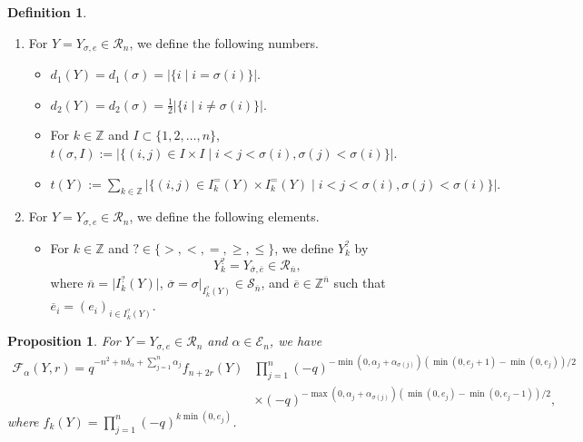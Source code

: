 \documentclass[11pt,oneside]{amsart}
\theoremstyle{plain}
\newtheorem{proposition}[theorem]{Proposition}
\theoremstyle{definition}
\newtheorem{definition}[theorem]{Definition}
\theoremstyle{remark}
\newcommand{\BZ}{{\mathbb Z}}
\newcommand{\CE}{{\mathcal E}}
\newcommand{\CF}{{\mathcal F}}
\newcommand{\CR}{{\mathcal R}}
\newcommand{\CS}{{\mathcal S}}
\numberwithin{equation}{section}
\begin{document}
\begin{definition}
\begin{enumerate}
			\item For $Y=Y_{\sigma,e} \in \CR_n$, we define the following numbers.
			\begin{itemize}
				\item $d_1(Y)=d_1(\sigma)=\vert \lbrace i \mid i=\sigma(i) \rbrace \vert $.
				\item $d_2(Y)=d_2(\sigma)=\frac{1}{2}\vert \lbrace i \mid i \neq \sigma(i) \rbrace \vert $.
				\item For $k \in \BZ$ and $I \subset \lbrace 1,2,\dots,n \rbrace$, $t(\sigma,I):=\vert \lbrace (i,j) \in I\times I \mid i < j <\sigma(i), \sigma(j) < \sigma(i) \rbrace\vert.$
				\item $t(Y):=\sum_{k \in \BZ}\vert \lbrace (i,j) \in I_k^{=}(Y)\times I_k^{=}(Y) \mid i < j <\sigma(i), \sigma(j) < \sigma(i) \rbrace\vert.$
			\end{itemize}
			
			\item For $Y=Y_{\sigma,e} \in \CR_n$, we define the following elements.
			\begin{itemize}
				\item For $k \in \BZ$ and $? \in \lbrace >,<,=,\geq, \leq \rbrace$, we define $Y^?_k$ by
				\begin{equation*}
					Y^{?}_k=Y_{\overline{\sigma},\overline{e}} \in \CR_{\overline{n}},
				\end{equation*}
				where $\overline{n}=\vert I^?_{k}(Y)\vert $, $\overline{\sigma}=\sigma\vert_{I^?_{k}(Y)} \in \CS_{\overline{n}}$, and $\overline{e} \in \BZ^{\overline{n}}$ such that $\overline{e}_i=(e_i)_{i \in I^?_{k}(Y)}$.
			\end{itemize}
			
		\end{enumerate}
	\end{definition}
	
	\begin{proposition}\label{proposition2.6}
		For $Y=Y_{\sigma,e} \in \CR_n$ and $\alpha \in \CE_n$, we have
		\begin{equation*}\begin{array}{ll}
				\CF_{\alpha}(Y,r)=q^{-n^2+n\delta_{\alpha}+\sum_{j=1}^n\alpha_j}f_{n+2r}(Y)&\prod_{j=1}^n (-q)^{-\min(0,\alpha_j+\alpha_{\sigma(j)}) (\min(0,e_j+1)-\min(0,e_j))/2}\\
				&\times(-q)^{-\max(0,\alpha_j+\alpha_{\sigma(j)}) (\min(0,e_j)-\min(0,e_j-1))/2},
			\end{array}
		\end{equation*}
		where $f_k(Y)=\prod_{j=1}^{n}(-q)^{k\min(0,e_j)}$.
	\end{proposition}
	
\end{document}
